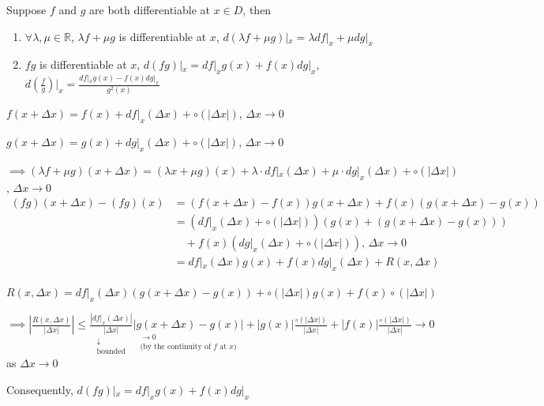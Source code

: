\begin{proposition}
    Suppose $f$ and $g$ are both differentiable at $x\in D$, then\begin{enumerate}
        \item $\forall\lambda,\mu\in\mathbb{R}$, $\lambda f+\mu g$ is differentiable at $x$, $d(\lambda f+\mu g)|_x=\lambda df|_x+\mu dg|_x$
        \item $fg$ is differentiable at $x$, $d(fg)|_x=df|_xg(x)+f(x)dg|_x$, $d(\frac{f}{g})|_x=\frac{df|_xg(x)-f(x)dg|_x}{g^2(x)}$
    \end{enumerate}
    \begin{pf}
        $f(x+\Delta x)=f(x)+df|_x(\Delta x)+\circ(|\Delta x|)$, $\Delta x\to0$

        $g(x+\Delta x)=g(x)+dg|_x(\Delta x)+\circ(|\Delta x|)$, $\Delta x\to0$

        $\implies(\lambda f+\mu g)(x+\Delta x)=(\lambda x+\mu g)(x)+\lambda\cdot df|_x(\Delta x)+\mu\cdot dg|_x(\Delta x)+\circ(|\Delta x|)$, $\Delta x\to0$
        \begin{align*}
            (fg)(x+\Delta x)-(fg)(x) & =(f(x+\Delta x)-f(x))g(x+\Delta x)+f(x)(g(x+\Delta x)-g(x))        \\
                                     & =(df|_x(\Delta x)+\circ(|\Delta x|))(g(x)+(g(x+\Delta x)-g(x)))    \\
                                     & \quad+f(x)(dg|_x(\Delta x)+\circ(|\Delta x|))\text{, }\Delta x\to0 \\
                                     & =df|_x(\Delta x)g(x)+f(x)dg|_x(\Delta x)+R(x,\Delta x)
        \end{align*}

        $R(x,\Delta x)=df|_x(\Delta x)(g(x+\Delta x)-g(x))+\circ(|\Delta x|)g(x)+f(x)\circ(|\Delta x|)$

        $\implies\left|\frac{R(x,\Delta x)}{|\Delta x|}\right|\leq\underset{\substack{\downarrow\\\text{bounded}}}{\frac{\left|df|_x(\Delta x)\right|}{|\Delta x|}}\underset{\substack{\to0\\\text{(by the continuity of $f$ at $x$)}}}{|g(x+\Delta x)-g(x)|}+|g(x)|\frac{\circ(|\Delta x|)}{|\Delta x|}+|f(x)|\frac{\circ(|\Delta x|)}{|\Delta x|}\to0$ as $\Delta x\to0$


        Consequently, $d(fg)|_x=df|_xg(x)+f(x)dg|_x$
    \end{pf}
\end{proposition}

